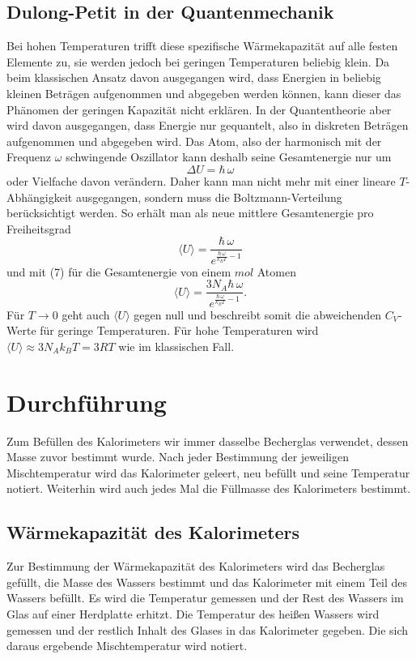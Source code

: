 \documentclass[12pt,a4paper]{article}
\begin{document}
\subsection{Dulong-Petit in der Quantenmechanik}
Bei hohen Temperaturen trifft diese spezifische Wärmekapazität auf alle festen Elemente zu, sie werden jedoch bei geringen Temperaturen beliebig klein. Da beim klassischen Ansatz davon ausgegangen wird, dass Energien in beliebig kleinen Beträgen aufgenommen und abgegeben werden können, kann dieser das Phänomen der geringen Kapazität nicht erklären.\newline
In der Quantentheorie aber wird davon ausgegangen, dass Energie nur gequantelt, also in diskreten Beträgen aufgenommen und abgegeben wird. \newline Das Atom, also der harmonisch mit der Frequenz $\omega$ schwingende Oszillator kann deshalb seine Gesamtenergie nur um 
\begin{equation}
\Delta U=\hbar\,\omega
\end{equation} oder Vielfache davon verändern.
Daher kann man nicht mehr mit einer lineare $T$-Abhängigkeit ausgegangen, sondern muss die Boltzmann-Verteilung berücksichtigt werden.\newline
So erhält man als neue mittlere Gesamtenergie pro Freiheitsgrad 
\begin{equation*}
\langle U \rangle = \frac{\hbar\,\omega}{e^{\frac{\hbar\,\omega}{k_BT}-1}}
\end{equation*}
und mit (7) für die Gesamtenergie von einem $mol$ Atomen
\begin{equation}
\langle U \rangle = \frac{3N_A\hbar\,\omega}{e^{\frac{\hbar\,\omega}{k_BT}-1}}.
\end{equation}
Für $T\rightarrow0$ geht auch $\langle U \rangle$ gegen null und beschreibt somit die abweichenden $C_V$-Werte für geringe Temperaturen.
Für hohe Temperaturen wird $\langle U \rangle \approx 3N_Ak_BT= 3RT$ wie im klassischen Fall.
\newpage
\section{Durchführung}
Zum Befüllen des Kalorimeters wir immer dasselbe Becherglas verwendet, dessen Masse zuvor bestimmt wurde. Nach jeder Bestimmung der jeweiligen Mischtemperatur wird das Kalorimeter geleert, neu befüllt und seine Temperatur notiert. Weiterhin wird auch jedes Mal die Füllmasse des Kalorimeters bestimmt.
\subsection{Wärmekapazität des Kalorimeters}
Zur Bestimmung der Wärmekapazität des Kalorimeters wird das Becherglas gefüllt, die Masse des Wassers bestimmt und das Kalorimeter mit einem Teil des Wassers befüllt. Es wird die Temperatur gemessen und der Rest des Wassers im Glas auf einer Herdplatte erhitzt. Die Temperatur des heißen Wassers wird gemessen und der restlich Inhalt des Glases in das Kalorimeter gegeben. Die sich daraus ergebende Mischtemperatur wird notiert.
\end{document}
